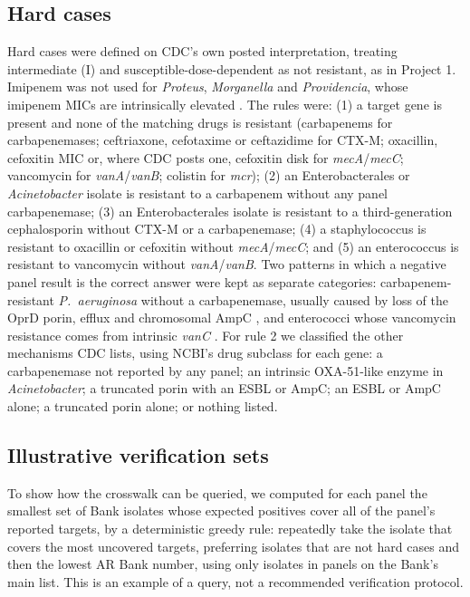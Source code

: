\documentclass[10pt,twocolumn,letterpaper]{article}
\newcommand{\g}[1]{\textit{#1}}  %
\newcommand{\pae}{\textit{P.~aeruginosa}}
\begin{document}
\subsection{Hard cases}

Hard cases were defined on CDC's own posted interpretation, treating intermediate (I) and susceptible-dose-dependent as
not resistant, as in Project 1. Imipenem was not used for \textit{Proteus}, \textit{Morganella} and
\textit{Providencia}, whose imipenem MICs are intrinsically elevated \cite{clsi2025}. The rules were: (1) a target gene is
present and none of the matching drugs is resistant (carbapenems for carbapenemases; ceftriaxone, cefotaxime or
ceftazidime for CTX-M; oxacillin, cefoxitin MIC or, where CDC posts one, cefoxitin disk for \g{mecA}/\g{mecC}; vancomycin
for \g{vanA}/\g{vanB}; colistin for \g{mcr}); (2) an Enterobacterales or \textit{Acinetobacter} isolate is resistant to a
carbapenem without any panel carbapenemase; (3) an Enterobacterales isolate is resistant to a third-generation
cephalosporin without CTX-M or a carbapenemase; (4) a staphylococcus is resistant to oxacillin or cefoxitin without
\g{mecA}/\g{mecC}; and (5) an enterococcus is resistant to vancomycin without \g{vanA}/\g{vanB}. Two patterns in which a
negative panel result is the correct answer were kept as separate categories: carbapenem-resistant \pae{} without a
carbapenemase, usually caused by loss of the OprD porin, efflux and chromosomal AmpC \cite{lister2009}, and enterococci
whose vancomycin resistance comes from intrinsic \g{vanC} \cite{cetinkaya2000}. For rule 2 we classified the other
mechanisms CDC lists, using NCBI's drug subclass for each gene: a carbapenemase not reported by any panel; an intrinsic
OXA-51-like enzyme in \textit{Acinetobacter}; a truncated porin with an ESBL or AmpC; an ESBL or AmpC alone; a truncated
porin alone; or nothing listed.

\subsection{Illustrative verification sets}

To show how the crosswalk can be queried, we computed for each panel the smallest set of Bank isolates whose expected
positives cover all of the panel's reported targets, by a deterministic greedy rule: repeatedly take the isolate that
covers the most uncovered targets, preferring isolates that are not hard cases and then the lowest AR Bank number, using
only isolates in panels on the Bank's main list. This is an example of a query, not a recommended verification protocol.
\end{document}
